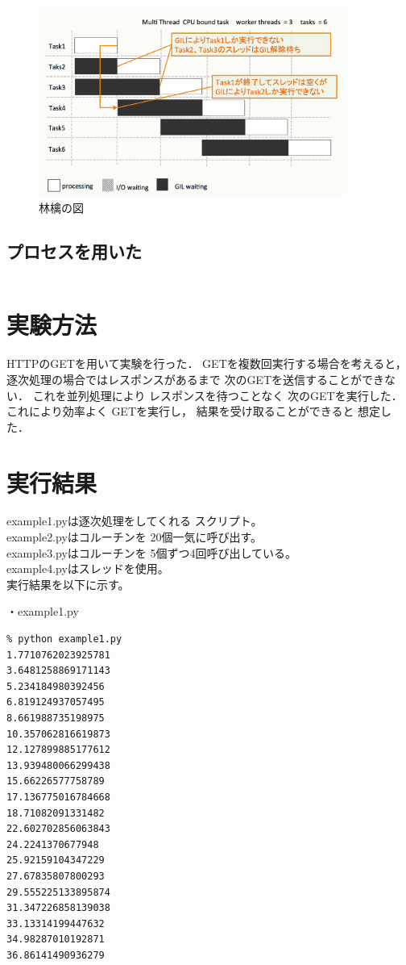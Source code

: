 \documentclass[14pt, oneside]{article}     	%
\begin{document}
\begin{figure}[h]
  \centering
  \includegraphics[width=10cm]{multithred_cpubound.png}
  \caption{林檎の図}
\end{figure}

\subsection{プロセスを用いた}

\begin{lstlisting}[caption=シンプレクス法プログラム]

\end{lstlisting}

\section{実験方法}
HTTPのGETを用いて実験を行った．
GETを複数回実行する場合を考えると，
逐次処理の場合ではレスポンスがあるまで
次のGETを送信することができない．
これを並列処理により
レスポンスを待つことなく
次のGETを実行した．
これにより効率よく
GETを実行し，
結果を受け取ることができると
想定した．

\section{実行結果}

example1.pyは逐次処理をしてくれる
スクリプト。\\
example2.pyはコルーチンを
20個一気に呼び出す。\\
example3.pyはコルーチンを
5個ずつ4回呼び出している。\\
example4.pyはスレッドを使用。\\


実行結果を以下に示す。

・example1.py
\begin{lstlisting}
% python example1.py
1.7710762023925781
3.6481258869171143
5.234184980392456
6.819124937057495
8.661988735198975
10.357062816619873
12.127899885177612
13.939480066299438
15.66226577758789
17.136775016784668
18.71082091331482
22.602702856063843
24.2241370677948
25.92159104347229
27.67835807800293
29.555225133895874
31.347226858139038
33.13314199447632
34.98287010192871
36.86141490936279
\end{lstlisting}
\end{document}
